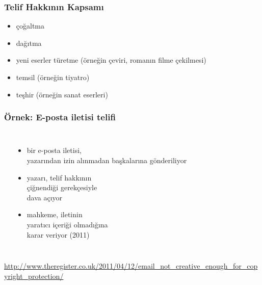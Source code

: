 \documentclass[dvipsnames]{beamer}
\theoremstyle{definition}
\theoremstyle{example}
\theoremstyle{plain}
\begin{document}
\begin{frame}
  \frametitle{Telif Hakkının Kapsamı}

  \begin{itemize}
    \item çoğaltma
    \item dağıtma
    \item yeni eserler türetme (örneğin çeviri, romanın filme çekilmesi)
    \item temsil (örneğin tiyatro)
    \item teşhir (örneğin sanat eserleri)
  \end{itemize}
\end{frame}

\begin{frame}
  \frametitle{Örnek: E-posta iletisi telifi}

  \begin{columns}
    \begin{center}
    \end{center}

    \begin{itemize}
      \item bir e-posta iletisi,\\
        yazarından izin alınmadan\/
        başkalarına gönderiliyor
      \item yazarı, telif hakkının\\
        çiğnendiği gerekçesiyle\\
        dava açıyor
      \item mahkeme, iletinin\\
        yaratıcı içeriği olmadığına\\
        karar veriyor (2011)
    \end{itemize}
  \end{columns}

  \medskip
  \tiny{\url{http://www.theregister.co.uk/2011/04/12/email_not_creative_enough_for_copyright_protection/}}\\
\end{frame}
\end{document}
